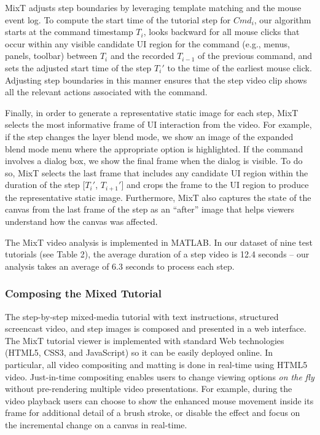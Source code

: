 MixT adjusts step boundaries by leveraging template matching and the mouse event log. To compute the start time of the tutorial step for $Cmd_i$, our algorithm starts at the command timestamp $T_i$, looks backward for all mouse clicks that occur within any visible candidate UI region for the command (e.g., menus, panels, toolbar) between $T_i$ and the recorded $T_{i-1}$ of the previous command, and sets the adjusted start time of the step $T_i'$ to the time of the earliest mouse click. Adjusting step boundaries in this manner ensures that the step video clip shows all the relevant actions associated with the command.

Finally, in order to generate a representative static image for each step, MixT selects the most informative frame of UI interaction from the video. For example, if the step changes the layer blend mode, we show an image of the expanded blend mode menu where the appropriate option is highlighted. If the command involves a dialog box, we show the final frame when the dialog is visible. To do so, MixT selects the last frame that includes any candidate UI region within the duration of the step [$T_i'$, $T_{i+1}'$] and crops the frame to the UI region to produce the representative static image. Furthermore, MixT also captures the state of the canvas from the last frame of the step as an ``after'' image that helps viewers understand how the canvas was affected.

The MixT video analysis is implemented in MATLAB. In our dataset of nine test tutorials (see Table 2), the average duration of a step video is 12.4 seconds – our analysis takes an average of 6.3 seconds to process each step.

\subsubsection{Composing the Mixed Tutorial}
The step-by-step mixed-media tutorial with text instructions, structured screencast video, and step images is composed and presented in a web interface. The MixT tutorial viewer is implemented with standard Web technologies (HTML5, CSS3, and JavaScript) so it can be easily deployed online. In particular, all video compositing and matting is done in real-time using HTML5 video. Just-in-time compositing enables users to change viewing options \emph{on the fly} without pre-rendering multiple video presentations. For example, during the video playback users can choose to show the enhanced mouse movement inside its frame for additional detail of a brush stroke, or disable the effect and focus on the incremental change on a canvas in real-time.
